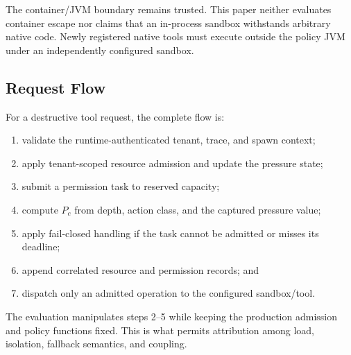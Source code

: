 \label{sec:arch-sandbox}
The container/JVM boundary remains trusted. This paper neither evaluates
container escape nor claims that an in-process sandbox withstands arbitrary
native code. Newly registered native tools must execute outside the policy
JVM under an independently configured sandbox.

\subsection{Request Flow}

For a destructive tool request, the complete flow is:

\begin{enumerate}
  \item validate the runtime-authenticated tenant, trace, and spawn context;
  \item apply tenant-scoped resource admission and update the pressure state;
  \item submit a permission task to reserved capacity;
  \item compute $P_c$ from depth, action class, and the captured pressure
  value;
  \item apply fail-closed handling if the task cannot be admitted or misses
  its deadline;
  \item append correlated resource and permission records; and
  \item dispatch only an admitted operation to the configured sandbox/tool.
\end{enumerate}

The evaluation manipulates steps 2--5 while keeping the production admission
and policy functions fixed. This is what permits attribution among load,
isolation, fallback semantics, and coupling.
